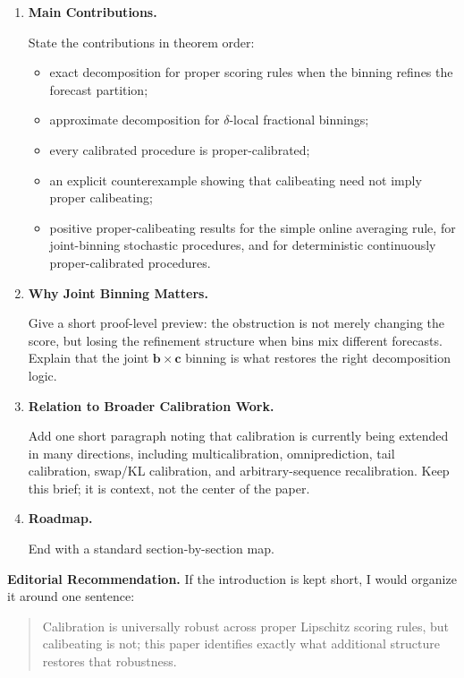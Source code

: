 \begin{enumerate}
\item \textbf{Main Contributions.}

State the contributions in theorem order:

\begin{itemize}
\item exact decomposition for proper scoring rules when the binning
refines the forecast partition;
\item approximate decomposition for $\delta$-local fractional binnings;
\item every calibrated procedure is proper-calibrated;
\item an explicit counterexample showing that calibeating need not imply
proper calibeating;
\item positive proper-calibeating results for the simple online
averaging rule, for joint-binning stochastic procedures, and for
deterministic continuously proper-calibrated procedures.
\end{itemize}

\item \textbf{Why Joint Binning Matters.}

Give a short proof-level preview: the obstruction is not merely changing
the score, but losing the refinement structure when bins mix different
forecasts. Explain that the joint $\mathbf{b\times c}$ binning is what
restores the right decomposition logic.

\item \textbf{Relation to Broader Calibration Work.}

Add one short paragraph noting that calibration is currently being
extended in many directions, including multicalibration,
omniprediction, tail calibration, swap/KL calibration, and
arbitrary-sequence recalibration. Keep this brief; it is context, not
the center of the paper.

\item \textbf{Roadmap.}

End with a standard section-by-section map.
\end{enumerate}

\bigskip

\noindent \textbf{Editorial Recommendation.} If the introduction is kept
short, I would organize it around one sentence:

\begin{quote}
Calibration is universally robust across proper Lipschitz scoring rules,
but calibeating is not; this paper identifies exactly what additional
structure restores that robustness.
\end{quote}
